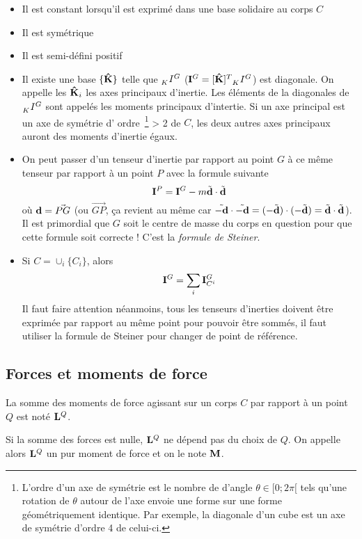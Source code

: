 \documentclass[11pt,a4paper]{article}
\newcommand\fv[1]{{\bf #1}} %
\newcommand\uk{{\bf\hat{K}}} %
\newcommand\wtr[3]{\ensuremath{\tensor*[_{ #1}]{ #2}{^{ #3}}}} %
\newcommand\ine{{\bf I}}
\newcommand\st{{\bf L}}
\newcommand\pst{{\bf M}}
\begin{document}
\begin{itemize}
	\item Il est constant lorsqu'il est exprimé dans une base solidaire au corps $C$
	\item Il est symétrique
	\item Il est semi-défini positif
	\item
		Il existe une base $\{\uk\}$ telle que $\wtr{K}{I}{G}$ ($\ine^G = [\uk]^T \wtr{K}{I}{G}$) est diagonale.
		On appelle les $\uk_i$ les axes principaux d'inertie.
		Les éléments de la diagonales de $\wtr{K}{I}{G}$ sont appelés les moments principaux d'intertie.
		Si un axe principal est un axe de symétrie d'
		ordre~\footnote{L'ordre d'un axe de symétrie est le nombre de d'angle $\theta \in [0; 2\pi[$ tels qu'une rotation de $\theta$ autour de l'axe envoie une forme sur une forme géométriquement identique.
		Par exemple, la diagonale d'un cube est un axe de symétrie d'ordre 4 de celui-ci.}
		> 2 de $C$, les deux autres axes principaux auront des moments d'inertie égaux.
	\item
		On peut passer d'un tenseur d'inertie par rapport au point $G$ à ce même tenseur par rapport à un point $P$ avec la formule suivante
		\[ \ine^P =  \ine^G - m \tilde{\fv{d}}\cdot\tilde{\fv{d}} \]
		où $\fv{d} = \vec{PG}$ (ou $\vec{GP}$, ça revient au même car $\tilde{-\fv{d}}\cdot\tilde{-\fv{d}} = (-\tilde{\fv{d}})\cdot(-\tilde{\fv{d}}) = \tilde{\fv{d}}\cdot\tilde{\fv{d}}$).
		Il est primordial que $G$ soit le centre de masse du corps en question pour que cette formule soit correcte !
		C'est la {\em formule de Steiner}.
	\item
		Si $C = \cup_i \{C_i\}$, alors
		\[ \ine^G = \sum_i \ine_{C^i}^G \]
		Il faut faire attention néanmoins, tous les tenseurs d'inerties doivent être exprimée par rapport au même point pour pouvoir être sommés, il faut utiliser la formule de Steiner pour changer de point de référence.
\end{itemize}

\subsection{Forces et moments de force}
La somme des moments de force agissant sur un corps $C$ par rapport à un point $Q$ est noté $\st^Q$.

Si la somme des forces est nulle, $\st^Q$ ne dépend pas du choix de $Q$.
On appelle alors $\st^Q$ un pur moment de force et on le note $\pst$.
\end{document}

